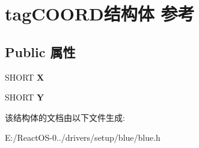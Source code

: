 \hypertarget{structtag_c_o_o_r_d}{}\section{tag\+C\+O\+O\+R\+D结构体 参考}
\label{structtag_c_o_o_r_d}
\subsection*{Public 属性}
\begin{DoxyCompactItemize}
\item 
\mbox{\label{structtag_c_o_o_r_d_ac2b48c311ec64dbaf07b4866efb4aed8}} 
S\+H\+O\+RT {\bfseries X}
\item 
\mbox{\label{structtag_c_o_o_r_d_a61c1e061f15ae66e571c5ed380b868f9}} 
S\+H\+O\+RT {\bfseries Y}
\end{DoxyCompactItemize}


该结构体的文档由以下文件生成\+:\begin{DoxyCompactItemize}
\item 
E\+:/\+React\+O\+S-\/0../drivers/setup/blue/blue.\+h\end{DoxyCompactItemize}
